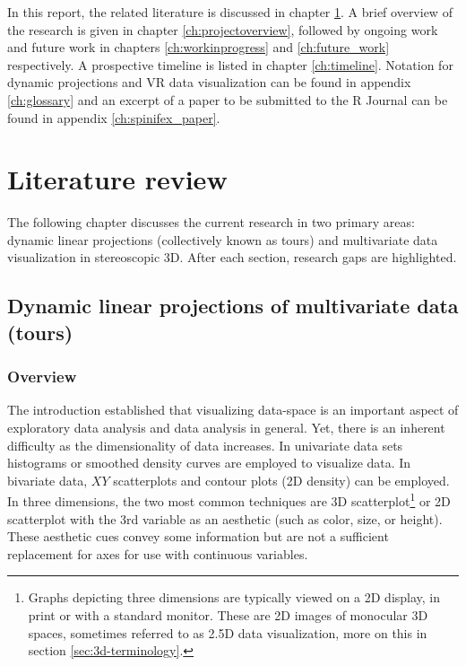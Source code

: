 \documentclass{monashthesis}
\begin{document}
In this report, the related literature is discussed in chapter
\ref{ch:lit_review}. A brief overview of the research is given in
chapter \ref{ch:projectoverview}, followed by ongoing work and future
work in chapters \ref{ch:workinprogress} and \ref{ch:future_work}
respectively. A prospective timeline is listed in chapter
\ref{ch:timeline}. Notation for dynamic projections and VR data
visualization can be found in appendix \ref{ch:glossary} and an excerpt
of a paper to be submitted to the R Journal can be found in appendix
\ref{ch:spinifex_paper}.

\chapter{Literature review}\label{ch:lit_review}

The following chapter discusses the current research in two primary
areas: dynamic linear projections (collectively known as tours) and
multivariate data visualization in stereoscopic 3D. After each section,
research gaps are highlighted.

\section{Dynamic linear projections of multivariate data
(tours)}\label{sec:tour}

\subsection{Overview}\label{overview}

The introduction established that visualizing data-space is an important
aspect of exploratory data analysis and data analysis in general. Yet,
there is an inherent difficulty as the dimensionality of data increases.
In univariate data sets histograms or smoothed density curves are
employed to visualize data. In bivariate data, \(XY\) scatterplots and
contour plots (2D density) can be employed. In three dimensions, the two
most common techniques are 3D
scatterplot\footnote{Graphs depicting three dimensions are typically viewed on a 2D display, in print or with a standard monitor. These are 2D images of monocular 3D spaces, sometimes referred to as 2.5D data visualization, more on this in section \ref{sec:3d-terminology}.}
or 2D scatterplot with the 3rd variable as an aesthetic (such as color,
size, or height). These aesthetic cues convey some information but are
not a sufficient replacement for axes for use with continuous variables.
\end{document}
